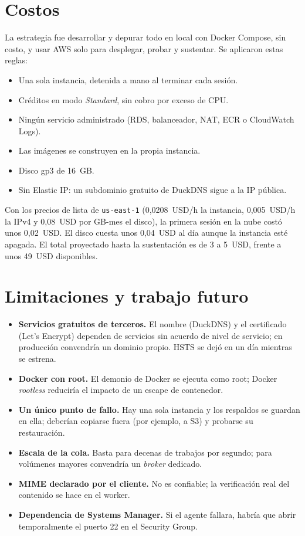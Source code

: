 \documentclass[conference,a4paper]{IEEEtran}
\newcommand{\cod}[1]{\texttt{#1}}
\begin{document}
\section{Costos}\label{sec:costos}

La estrategia fue desarrollar y depurar todo en local con Docker Compose, sin costo, y usar AWS solo para desplegar, probar y sustentar. Se aplicaron estas reglas:
\begin{itemize}
\item Una sola instancia, detenida a mano al terminar cada sesión.
\item Créditos en modo \textit{Standard}, sin cobro por exceso de CPU.
\item Ningún servicio administrado (RDS, balanceador, NAT, ECR o CloudWatch Logs).
\item Las imágenes se construyen en la propia instancia.
\item Disco gp3 de 16~GB.
\item Sin Elastic IP: un subdominio gratuito de DuckDNS sigue a la IP pública.
\end{itemize}
Con los precios de lista de \cod{us-east-1} (0,0208~USD/h la instancia, 0,005~USD/h la IPv4 y 0,08~USD por GB-mes el disco), la primera sesión en la nube costó unos 0,02~USD. El disco cuesta unos 0,04~USD al día aunque la instancia esté apagada. El total proyectado hasta la sustentación es de 3 a 5~USD, frente a unos 49~USD disponibles.

\section{Limitaciones y trabajo futuro}\label{sec:lim}

\begin{itemize}
\item \textbf{Servicios gratuitos de terceros.} El nombre (DuckDNS) y el certificado (Let's Encrypt) dependen de servicios sin acuerdo de nivel de servicio; en producción convendría un dominio propio. HSTS se dejó en un día mientras se estrena.
\item \textbf{Docker con root.} El demonio de Docker se ejecuta como root; Docker \textit{rootless} reduciría el impacto de un escape de contenedor.
\item \textbf{Un único punto de fallo.} Hay una sola instancia y los respaldos se guardan en ella; deberían copiarse fuera (por ejemplo, a S3) y probarse su restauración.
\item \textbf{Escala de la cola.} Basta para decenas de trabajos por segundo; para volúmenes mayores convendría un \textit{broker} dedicado.
\item \textbf{MIME declarado por el cliente.} No es confiable; la verificación real del contenido se hace en el worker.
\item \textbf{Dependencia de Systems Manager.} Si el agente fallara, habría que abrir temporalmente el puerto 22 en el Security Group.
\end{itemize}
\end{document}
